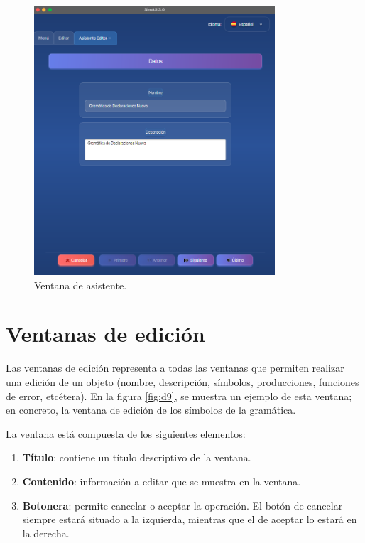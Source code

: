\begin{figure}[htp]
\centering
	\includegraphics[width=0.8\textwidth]{figuras2/ejemplo_practico/editor_paso1.png}
	\caption{Ventana de asistente.}
	\label{fig:d8}
\end{figure}

\section{Ventanas de edición}

Las ventanas de edición representa a todas las ventanas que permiten realizar una edición de un objeto (nombre, descripción, símbolos, producciones, funciones de error, etcétera). En la figura \ref{fig:d9}, se muestra un ejemplo de esta ventana; en concreto, la ventana de edición de los símbolos de la gramática.

La ventana está compuesta de los siguientes elementos:
\begin{enumerate}
 \item \textbf{Título}: contiene un título descriptivo de la ventana.
 \item \textbf{Contenido}: información a editar que se muestra en la ventana.
 \item \textbf{Botonera}: permite cancelar o aceptar la operación. El botón de cancelar siempre estará situado a la izquierda, mientras que el de aceptar lo estará en la derecha.
\end{enumerate}

